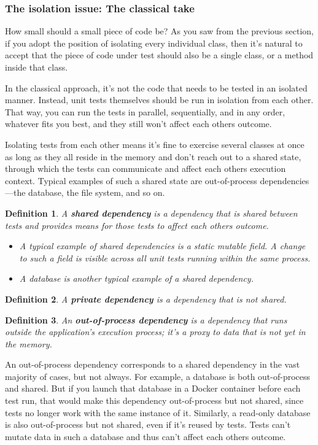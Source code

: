 \documentclass{article}
\newtheorem{definition}{Definition}
\begin{document}
\subsubsection{The isolation issue: The classical take}
How small should a small piece of code be? As you saw from the previous section, if you adopt the position of isolating every individual class, then it’s natural to accept that the piece of code under test should also be a single class, or a method inside that class. 

In the classical approach, it’s not the code that needs to be tested in an isolated manner. Instead, unit tests themselves should be run in isolation from each other. That way, you can run the tests in parallel, sequentially, and in any order, whatever fits you best, and they still won’t affect each others outcome.

Isolating tests from each other means it’s fine to exercise several classes at once as long as they all reside in the memory and don’t reach out to a shared state, through which the tests can communicate and affect each others execution context. Typical examples of such a shared state are out-of-process dependencies—the database, the file system, and so on.

\begin{definition}
A \textbf{shared dependency} is a dependency that is shared between tests and provides means for those tests to affect each others outcome. 
\begin{itemize}
	\item A typical example of shared dependencies is a static mutable field. A change to such a field is visible across all unit tests running within the same process. 
	\item A database is another typical example of a shared dependency.
\end{itemize}
\end{definition}

\begin{definition}
A \textbf{private dependency} is a dependency that is not shared.
\end{definition}

\begin{definition}
An \textbf{out-of-process dependency} is a dependency that runs outside the application’s execution process; it’s a proxy to data that is not yet in the memory. 
\end{definition}

 An out-of-process dependency corresponds to a shared dependency in the vast majority of cases, but not always. For example, a database is both out-of-process and shared. But if you launch that database in a Docker container before each test run, that would make this dependency out-of-process but not shared, since tests no longer work with the same instance of it. Similarly, a read-only database is also out-of-process but not shared, even if it’s reused by tests. Tests can’t mutate data in such a database and thus can’t affect each others outcome.
\end{document}
